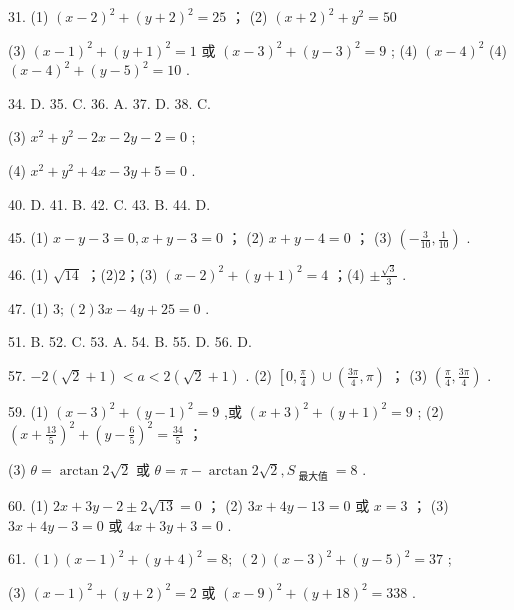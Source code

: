 \documentclass[10pt]{article}
\begin{document}
31. (1) \({\left( x - 2\right) }^{2} + {\left( y + 2\right) }^{2} = {25}\) ； (2) \({\left( x + 2\right) }^{2} + {y}^{2} = {50}\)

(3) \({\left( x - 1\right) }^{2} + {\left( y + 1\right) }^{2} = 1\) 或 \({\left( x - 3\right) }^{2} + {\left( y - 3\right) }^{2} = 9\) ; (4) \({\left( x - 4\right) }^{2}\) (4) \({\left( x - 4\right) }^{2} + {\left( y - 5\right) }^{2} = {10}\) .

34. D. 35. C. 36. A. 37. D. 38. C.

(3) \({x}^{2} + {y}^{2} - {2x} - {2y} - 2 = 0\) ;

(4) \({x}^{2} + {y}^{2} + {4x} - {3y} + 5 = 0\) .

40. D. 41. B. 42. C. 43. B. 44. D.

45. (1) \(x - y - 3 = 0,x + y - 3 = 0\) ； (2) \(x + y - 4 = 0\) ； (3) \(\left( {-\frac{3}{10},\frac{1}{10}}\right)\) .

46. (1) \(\sqrt{14}\) ；(2)2；(3) \({\left( x - 2\right) }^{2} + {\left( y + 1\right) }^{2} = 4\) ；(4) \(\pm  \frac{\sqrt{3}}{3}\) .

47. (1) \(3;\left( 2\right) {3x} - {4y} + {25} = 0\) .

51. B. 52. C. 53. A. 54. B. 55. D. 56. D.

57. \(- 2\left( {\sqrt{2} + 1}\right)  < a < 2\left( {\sqrt{2} + 1}\right)\) . (2) \(\left\lbrack  {0,\frac{\pi }{4}}\right)  \cup  \left( {\frac{3\pi }{4},\pi }\right)\) ； (3) \(\left( {\frac{\pi }{4},\frac{3\pi }{4}}\right)\) .

59. (1) \({\left( x - 3\right) }^{2} + {\left( y - 1\right) }^{2} = 9\) ,或 \({\left( x + 3\right) }^{2} + {\left( y + 1\right) }^{2} = 9\) ; (2) \({\left( x + \frac{13}{5}\right) }^{2} + {\left( y - \frac{6}{5}\right) }^{2} = \frac{34}{5}\) ；

(3) \(\theta  = \arctan 2\sqrt{2}\) 或 \(\theta  = \pi  - \arctan 2\sqrt{2},{S}_{\text{ 最大值 }} = 8\) .

60. (1) \({2x} + {3y} - 2 \pm  2\sqrt{13} = 0\) ； (2) \({3x} + {4y} - {13} = 0\) 或 \(x = 3\) ； (3) \({3x} + {4y} - 3 = 0\) 或 \({4x} + {3y} + 3 = 0\) .

61. \(\left( 1\right) {\left( x - 1\right) }^{2} + {\left( y + 4\right) }^{2} = 8;\;\left( 2\right) {\left( x - 3\right) }^{2} + {\left( y - 5\right) }^{2} = {37}\) ;

(3) \({\left( x - 1\right) }^{2} + {\left( y + 2\right) }^{2} = 2\) 或 \({\left( x - 9\right) }^{2} + {\left( y + {18}\right) }^{2} = {338}\) .
\end{document}
